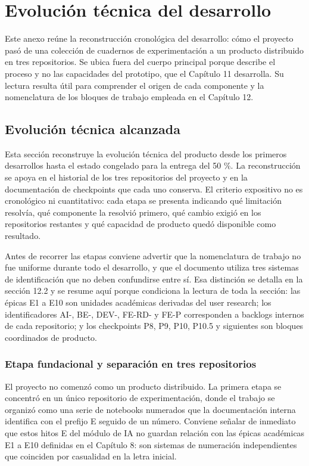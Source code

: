 \chapter{Evolución técnica del desarrollo}
\label{anexo:evolucion-tecnica}

Este anexo reúne la reconstrucción cronológica del desarrollo: cómo el proyecto pasó de una colección de cuadernos de experimentación a un producto distribuido en tres repositorios. Se ubica fuera del cuerpo principal porque describe el proceso y no las capacidades del prototipo, que el Capítulo 11 desarrolla. Su lectura resulta útil para comprender el origen de cada componente y la nomenclatura de los bloques de trabajo empleada en el Capítulo 12.

\section{Evolución técnica alcanzada}

Esta sección reconstruye la evolución técnica del producto desde los primeros desarrollos hasta el estado congelado para la entrega del 50 \%. La reconstrucción se apoya en el historial de los tres repositorios del proyecto y en la documentación de checkpoints que cada uno conserva. El criterio expositivo no es cronológico ni cuantitativo: cada etapa se presenta indicando qué limitación resolvía, qué componente la resolvió primero, qué cambio exigió en los repositorios restantes y qué capacidad de producto quedó disponible como resultado.

Antes de recorrer las etapas conviene advertir que la nomenclatura de trabajo no fue uniforme durante todo el desarrollo, y que el documento utiliza tres sistemas de identificación que no deben confundirse entre sí. Esa distinción se detalla en la sección 12.2 y se resume aquí porque condiciona la lectura de toda la sección: las épicas E1 a E10 son unidades académicas derivadas del user research; los identificadores AI-, BE-, DEV-, FE-RD- y FE-P corresponden a backlogs internos de cada repositorio; y los checkpoints P8, P9, P10, P10.5 y siguientes son bloques coordinados de producto.

\subsection{Etapa fundacional y separación en tres repositorios}
\label{anexo:f-etapa-fundacional}

El proyecto no comenzó como un producto distribuido. La primera etapa se concentró en un único repositorio de experimentación, donde el trabajo se organizó como una serie de notebooks numerados que la documentación interna identifica con el prefijo E seguido de un número. Conviene señalar de inmediato que estos hitos E del módulo de IA no guardan relación con las épicas académicas E1 a E10 definidas en el Capítulo 8: son sistemas de numeración independientes que coinciden por casualidad en la letra inicial.

